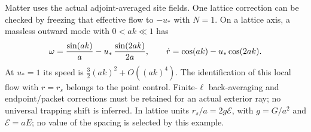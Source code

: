 Matter uses the actual adjoint-averaged site fields. One lattice correction
can be checked by freezing that effective flow to $-u_*$ with $N=1$.
On a lattice axis, a massless outward mode with $0<ak\ll1$ has
\[
 \omega={\sin(ak)\over a}-u_*\,{\sin(2ak)\over2a},\qquad
 \dot r=\cos(ak)-u_*\cos(2ak).
\]
At $u_*=1$ its speed is
$\tfrac32(ak)^2+O((ak)^4)$.
The identification of this local flow with $r=r_s$ belongs to the point
control. Finite-$\ell$ back-averaging and endpoint/packet corrections must
be retained for an actual exterior ray; no universal trapping shift is inferred.
In lattice units $r_s/a=2g\mathcal E$, with $g=G/a^2$ and
$\mathcal E=aE$; no value of the spacing is selected by this example.
